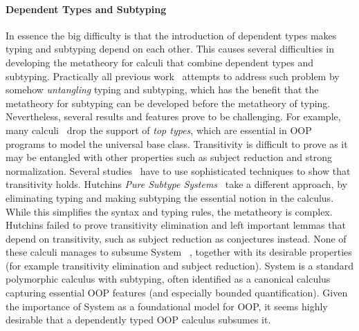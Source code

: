 \paragraph{Dependent Types and Subtyping}
In essence the big difficulty is that the introduction of dependent
types makes typing and subtyping depend on each other. This causes
several difficulties in developing the metatheory for calculi that
combine dependent types and subtyping. Practically all previous
work~\cite{subdep,ptssub,chen1,cocsub,Chen03coc} attempts to address such problem by somehow
\emph{untangling} typing and subtyping, which has the benefit that the
metatheory for subtyping can be developed before the metatheory of
typing. Nevertheless, several results and features prove to be
challenging. For example, many calculi~\cite{subdep,ptssub}
drop the support of \emph{top types}, which are essential in OOP
programs to model the universal base class. Transitivity is difficult
to prove as it may be entangled with other properties such as
subject reduction and strong normalization.
Several studies~\cite{subdep,chen1} have
to use sophisticated techniques to show that transitivity
holds. Hutchins \emph{Pure
  Subtype Systems}~\cite{hutchins} take a different approach, by
eliminating typing and making subtyping the essential notion in the
calculus.  While this simplifies the syntax and typing rules, the metatheory is complex. Hutchins failed
to prove transitivity elimination and left
important lemmas that depend on transitivity, such as
subject reduction as
conjectures instead. 
None of these calculi manages to subsume
System \fsub~\cite{fsub}, together with its desirable properties (for
example transitivity elimination and subject reduction). System
\fsub is a standard polymorphic calculus with subtyping, often
identified as a canonical calculus capturing 
essential OOP features (and especially bounded quantification). 
Given the importance of System \fsub as a foundational 
model for OOP, it seems highly desirable that a dependently 
typed OOP calculus subsumes it.

